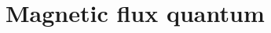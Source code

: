 \hypertarget{group___magnetic_flux_quantum}{}\section{Magnetic flux quantum}
\label{group___magnetic_flux_quantum}
